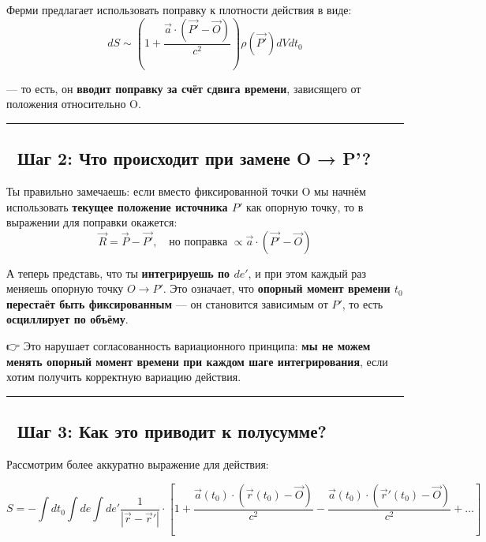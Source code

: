 \documentclass[11pt]{article}
\begin{document}
Ферми предлагает использовать поправку к плотности действия в виде: \[
dS \sim \left(1 + \frac{\vec{a} \cdot (\vec{P'} - \vec{O})}{c^2}\right) \rho(\vec{P'}) dV dt_0
\]

--- то есть, он \textbf{вводит поправку за счёт сдвига времени},
зависящего от положения относительно O.

\begin{center}\rule{0.5\linewidth}{\linethickness}\end{center}

\subsection{📌 Шаг 2: Что происходит при замене O →
P'?}\label{ux448ux430ux433-2-ux447ux442ux43e-ux43fux440ux43eux438ux441ux445ux43eux434ux438ux442-ux43fux440ux438-ux437ux430ux43cux435ux43dux435-o-p}

Ты правильно замечаешь: если вместо фиксированной точки O мы начнём
использовать \textbf{текущее положение источника \(P'\)} как опорную
точку, то в выражении для поправки окажется: \[
\vec{R} = \vec{P} - \vec{P'}, \quad \text{но поправка } \propto \vec{a} \cdot (\vec{P'} - \vec{O})
\]

А теперь представь, что ты \textbf{интегрируешь по \(de'\)}, и при этом
каждый раз меняешь опорную точку \(O \to P'\). Это означает, что
\textbf{опорный момент времени \(t_0\) перестаёт быть фиксированным} ---
он становится зависимым от \(P'\), то есть \textbf{осциллирует по
объёму}.

👉 Это нарушает согласованность вариационного принципа: \textbf{мы не
можем менять опорный момент времени при каждом шаге интегрирования},
если хотим получить корректную вариацию действия.

\begin{center}\rule{0.5\linewidth}{\linethickness}\end{center}

\subsection{📌 Шаг 3: Как это приводит к
полусумме?}\label{ux448ux430ux433-3-ux43aux430ux43a-ux44dux442ux43e-ux43fux440ux438ux432ux43eux434ux438ux442-ux43a-ux43fux43eux43bux443ux441ux443ux43cux43cux435}

Рассмотрим более аккуратно выражение для действия:

\[
S = -\int dt_0 \int de \int de' \frac{1}{|\vec{r} - \vec{r}'|}
\cdot \left[1 + \frac{\vec{a}(t_0) \cdot (\vec{r}(t_0) - \vec{O})}{c^2} - \frac{\vec{a}(t_0) \cdot (\vec{r}'(t_0) - \vec{O})}{c^2} + \dots \right]
\]
\end{document}
